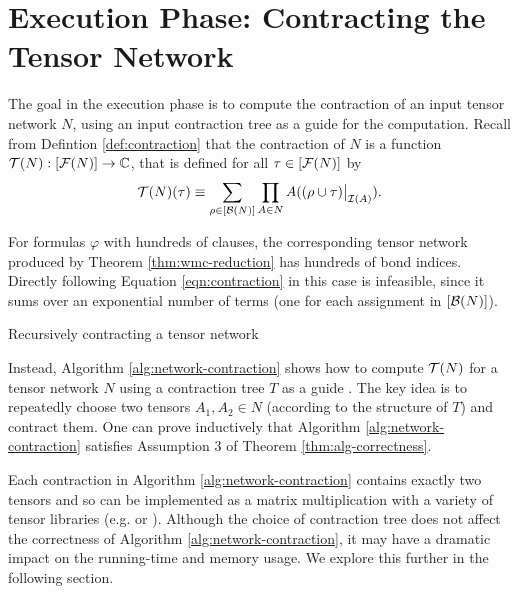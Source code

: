 \section{Execution Phase: Contracting the Tensor Network}
\label{sec:tensors:execution}
The goal in the execution phase is to compute the contraction of an input tensor network $N$, using an input contraction tree as a guide for the computation. Recall from Defintion \ref{def:contraction} that the contraction of $N$ is a function $\mathcal{T}(N) : [\mathcal{F}(N)] \rightarrow \mathbb{C}$, that is defined for all $\tau \in [\mathcal{F}(N)]$ by
		\begin{equation}
		\label{eqn:contraction}
        \mathcal{T}(N)(\tau) \equiv \sum_{\rho \in [\mathcal{B}(N)]} \prod_{A \in N} A((\rho \cup \tau)\big|_{\mathcal{I}(A)}).
        \end{equation}

For formulas $\varphi$ with hundreds of clauses, the corresponding tensor network produced by Theorem \ref{thm:wmc-reduction} has hundreds of bond indices. Directly following Equation \ref{eqn:contraction} in this case is infeasible, since it sums over an exponential number of terms (one for each assignment in $[\mathcal{B}(N)]$).

\begin{algorithm*}[t]
    \label{alg:network-contraction}
    \caption{Recursively contracting a tensor network}
    
    \DontPrintSemicolon
\end{algorithm*}

Instead, Algorithm \ref{alg:network-contraction} shows how to compute $\mathcal{T}(N)$ for a tensor network $N$ using a contraction tree $T$ as a guide \cite{EP14}. The key idea is to repeatedly choose two tensors $A_1, A_2 \in N$ (according to the structure of $T$) and contract them. One can prove inductively that Algorithm \ref{alg:network-contraction} satisfies Assumption 3 of Theorem \ref{thm:alg-correctness}.

Each contraction in Algorithm \ref{alg:network-contraction} contains exactly two tensors and so can be implemented as a matrix multiplication with a variety of tensor libraries (e.g.  \cite{numpy} or  \cite{ABCCDDDGII16}).
Although the choice of contraction tree does not affect the correctness of Algorithm \ref{alg:network-contraction}, it may have a dramatic impact on the running-time and memory usage. We explore this further in the following section.

